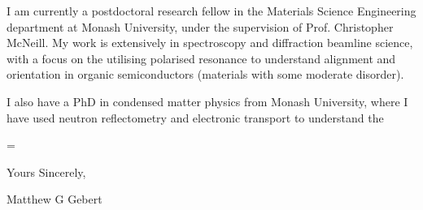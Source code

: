 \documentclass[10pt,a4paper,ragged2e,withhyper,paragraphstrue]{altacv}
\newcommand{\textalignment}{
	\justifying
    \tolerance=1 %
    \emergencystretch=\maxdimen
    \hyphenpenalty=10000 
    \hbadness=10000
}
\newcommand{\pind}{\hspace{24pt}}
\begin{document}
    \pind I am currently a postdoctoral research fellow in the Materials Science Engineering department at Monash University, under the supervision of Prof. Christopher McNeill. My work is extensively in spectroscopy and diffraction beamline science, with a focus on the utilising polarised resonance to understand alignment and orientation in organic semiconductors (materials with some moderate disorder).
    
    I also have a PhD in condensed matter physics from Monash University, where I have used neutron reflectometry and electronic transport to understand the 

	


    {\color{emphasis}
    \textalignment

		
    \vspace{1em}

    Yours Sincerely, \newline

    {\color{emphasis}Matthew G Gebert}

    }
    
    \divider
\end{document}
